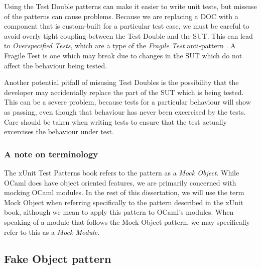 Using the Test Double patterns can make it easier to write unit tests,
but missuse of the patterns can cause problems. Because we are
replacing a DOC with a component that is custom-built for a particular
test case, we must be careful to avoid overly tight coupling between
the Test Double and the SUT. This can lead to \textit{Overspecified
  Tests}, which are a type of the \textit{Fragile Test} anti-pattern
\cite{meszaros:xunit}. A Fragile Test is one which may break due to
changes in the SUT which do not affect the behaviour being tested.

Another potential pitfall of misusing Test Doubles is the possibility
that the developer may accidentally replace the part of the SUT which
is being tested. This can be a severe problem, because tests for a
particular behaviour will show as passing, even though that behaviour
has never been excercised by the tests. Care should be taken when
writing tests to ensure that the test actually excercises the
behaviour under test.

\subsubsection{A note on terminology}

The xUnit Test Patterns book refers to the pattern as a \textit{Mock
  Object}. While OCaml does have object oriented features, we are
primarily concerned with mocking OCaml modules. In the rest of this
dissertation, we will use the term Mock Object when referring
specifically to the pattern described in the xUnit book, although we
mean to apply this pattern to OCaml's modules. When speaking of a
module that follows the Mock Object pattern, we may specifically refer
to this as a \textit{Mock Module}.



\newcommand{\definition}[1]{\hangindent=1cm \textbf{#1}}

\subsection{Fake Object pattern}
\label{testdoubles:fake}

